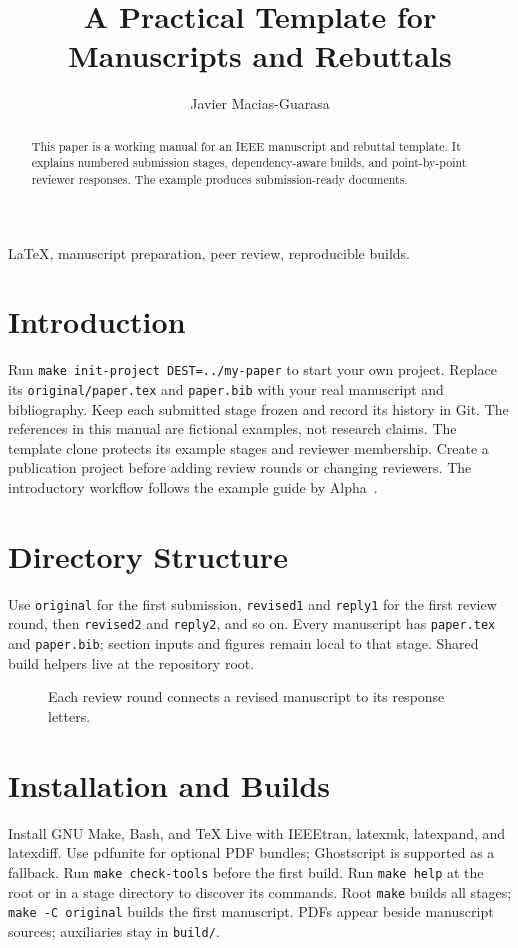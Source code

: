 \documentclass[journal]{IEEEtran}
\title{A Practical Template for Manuscripts and Rebuttals}
\author{Javier Macias-Guarasa}
\begin{document}
\maketitle
\begin{abstract}
This paper is a working manual for an IEEE manuscript and rebuttal template.
It explains numbered submission stages, dependency-aware builds, and point-by-point reviewer responses.
The example produces submission-ready documents.
\end{abstract}
\begin{IEEEkeywords}
LaTeX, manuscript preparation, peer review, reproducible builds.
\end{IEEEkeywords}
\section{Introduction}
Run \texttt{make init-project DEST=../my-paper} to start your own project.
Replace its \texttt{original/paper.tex} and \texttt{paper.bib} with your real manuscript
and bibliography. Keep each submitted stage frozen and record its history in Git.
The references in this manual are fictional examples, not research claims.
The template clone protects its example stages and reviewer membership.
Create a publication project before adding review rounds or changing reviewers.
The introductory workflow follows the example guide by Alpha~\cite{guide}.
\section{Directory Structure}
Use \texttt{original} for the first submission, \texttt{revised1} and \texttt{reply1}
for the first review round, then \texttt{revised2} and \texttt{reply2}, and so on.
Every manuscript has \texttt{paper.tex} and \texttt{paper.bib}; section inputs and figures
remain local to that stage. Shared build helpers live at the repository root.
\begin{figure}[!b]
\centering

\caption{Each review round connects a revised manuscript to its response letters.}
\label{fig:workflow}
\end{figure}
\section{Installation and Builds}
Install GNU Make, Bash, and TeX Live with IEEEtran, latexmk, latexpand, and latexdiff.
Use pdfunite for optional PDF bundles; Ghostscript is supported as a fallback.
Run \texttt{make check-tools} before the first build.
Run \texttt{make help} at the root or in a stage directory to discover its commands.
Root \texttt{make} builds all stages; \texttt{make -C original} builds the first manuscript.
PDFs appear beside manuscript sources; auxiliaries stay in \texttt{build/}.

\end{document}
